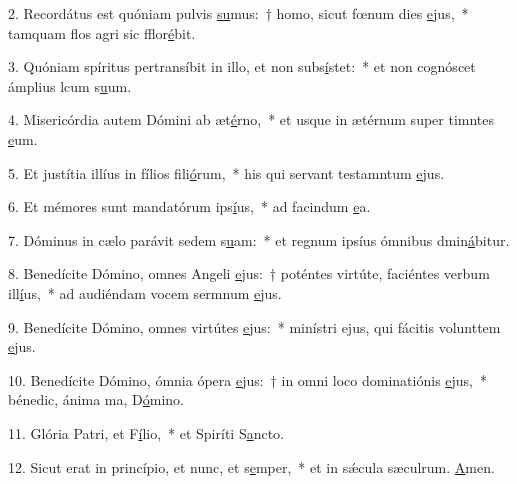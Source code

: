 2. Recordátus est quóniam pulvis \uline{su}mus:~† homo, sicut fœnum dies \uline{e}jus,~* tamquam flos agri sic fflor\uline{é}bit.\par 
3. Quóniam spíritus pertransíbit in illo, et non subs\uline{í}stet:~* et non cognóscet ámplius lcum s\uline{u}um.\par 
4. Misericórdia autem Dómini ab æt\uline{é}rno,~* et usque in ætérnum super timntes \uline{e}um.\par 
5. Et justítia illíus in fílios fili\uline{ó}rum,~* his qui servant testamntum \uline{e}jus.\par 
6. Et mémores sunt mandatórum ips\uline{í}us,~* ad facindum \uline{e}a.\par 
7. Dóminus in cælo parávit sedem s\uline{u}am:~* et regnum ipsíus ómnibus dmin\uline{á}bitur.\par 
8. Benedícite Dómino, omnes Angeli \uline{e}jus:~† poténtes virtúte, faciéntes verbum ill\uline{í}us,~* ad audiéndam vocem sermnum \uline{e}jus.\par 
9. Benedícite Dómino, omnes virtútes \uline{e}jus:~* minístri ejus, qui fácitis volunttem \uline{e}jus.\par 
10. Benedícite Dómino, ómnia ópera \uline{e}jus:~† in omni loco dominatiónis \uline{e}jus,~* bénedic, ánima ma, D\uline{ó}mino.\par 
11. Glória Patri, et F\uline{í}lio,~* et Spiríti S\uline{a}ncto.\par 
12. Sicut erat in princípio, et nunc, et s\uline{e}mper,~* et in sǽcula sæculrum. \uline{A}men.\par 
